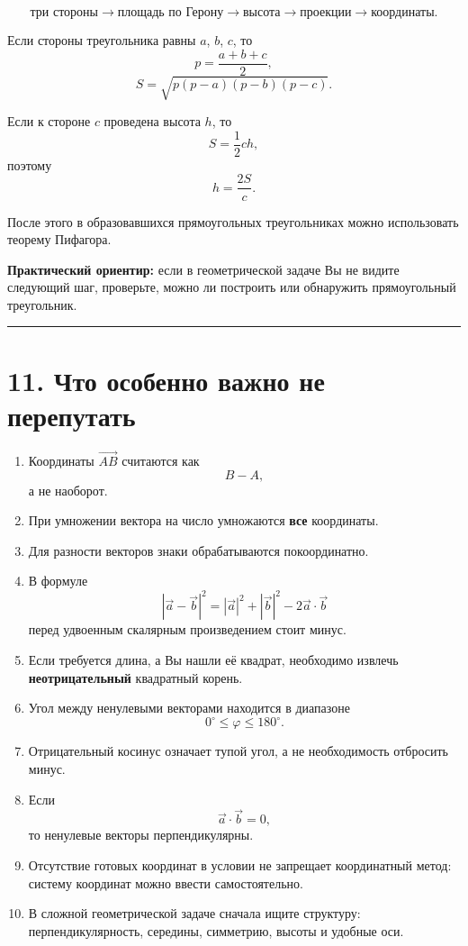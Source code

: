 \documentclass[a4paper,12pt]{article}
\newcommand{\vect}[1]{\overrightarrow{#1}}
\newcommand{\vct}[1]{\vec{#1}}
\newcommand{\sectionline}{%
    \par\noindent
    {\color{linegray}\rule{\linewidth}{0.5pt}}
    \par
}
\begin{document}
\[
\boxed{
\text{три стороны}
\longrightarrow
\text{площадь по Герону}
\longrightarrow
\text{высота}
\longrightarrow
\text{проекции}
\longrightarrow
\text{координаты}
}.
\]

Если стороны треугольника равны $a$, $b$, $c$, то
\[
p=\frac{a+b+c}{2},
\]
\[
\boxed{
S=\sqrt{p(p-a)(p-b)(p-c)}
}.
\]

Если к стороне $c$ проведена высота $h$, то
\[
S=\frac12ch,
\]
поэтому
\[
\boxed{h=\frac{2S}{c}}.
\]

После этого в образовавшихся прямоугольных треугольниках можно
использовать теорему Пифагора.

\textbf{Практический ориентир:}
если в геометрической задаче Вы не видите следующий шаг, проверьте,
можно ли построить или обнаружить прямоугольный треугольник.

\sectionline

\section*{\color{darkaccent}11. Что особенно важно не перепутать}

\begin{enumerate}
    \item
    Координаты $\vect{AB}$ считаются как
    \[
    B-A,
    \]
    а не наоборот.

    \item
    При умножении вектора на число умножаются \textbf{все} координаты.

    \item
    Для разности векторов знаки обрабатываются покоординатно.

    \item
    В формуле
    \[
    |\vct a-\vct b|^2
    =
    |\vct a|^2+|\vct b|^2-2\vct a\cdot\vct b
    \]
    перед удвоенным скалярным произведением стоит минус.

    \item
    Если требуется длина, а Вы нашли её квадрат, необходимо извлечь
    \textbf{неотрицательный} квадратный корень.

    \item
    Угол между ненулевыми векторами находится в диапазоне
    \[
    0^\circ\le\varphi\le180^\circ.
    \]

    \item
    Отрицательный косинус означает тупой угол, а не необходимость
    отбросить минус.

    \item
    Если
    \[
    \vct a\cdot\vct b=0,
    \]
    то ненулевые векторы перпендикулярны.

    \item
    Отсутствие готовых координат в условии не запрещает координатный
    метод: систему координат можно ввести самостоятельно.

    \item
    В сложной геометрической задаче сначала ищите структуру:
    перпендикулярность, середины, симметрию, высоты и удобные оси.
\end{enumerate}
\end{document}
